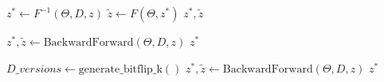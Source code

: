 \documentclass{article}
\theoremstyle{example}
\theoremstyle{plain}
\theoremstyle{definition}
\theoremstyle{remark}
\begin{document}
\color{black}
\begin{algorithm}[H]
\begin{algorithmic}[1]
    \State $z^* \gets F^{-1}(\Theta,D,z)$
    \State $\tilde{z} \gets F(\Theta,z^*)$
    \State \Return $z^*, \tilde{z}$
\EndFunction

        \State $z^*, \tilde{z} \gets \text{BackwardForward}(\Theta, D, z)$
            \State \Return $z^*$
        \EndIf
    \EndFor
\EndFunction

        \State $D\_versions \gets \text{generate\_bitflip\_k}()$
            \State $z^*, \tilde{z} \gets \text{BackwardForward}(\Theta, D, z)$
                \State \Return$z^*$
            \EndIf
        \EndFor
    \EndFor
\EndFunction

\end{algorithmic}
\end{algorithm}
\end{document}
